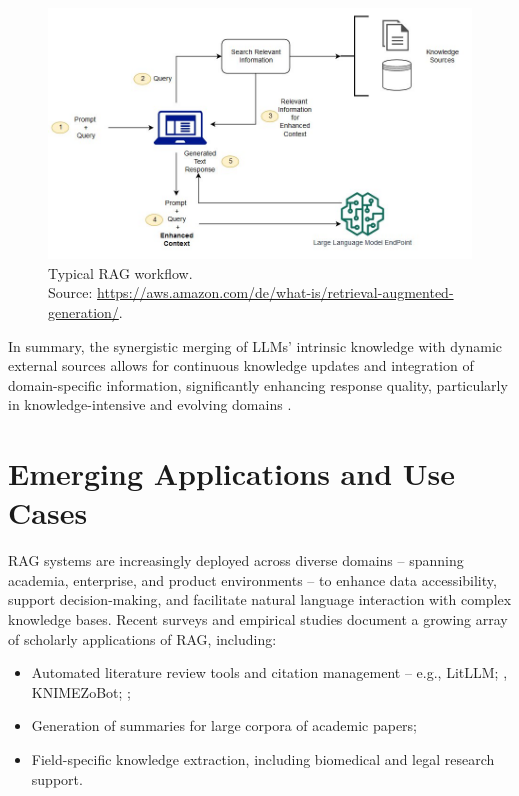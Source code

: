 \begin{spacing}{1.5}
\vspace{0.5em}
\begin{figure}[H]
  \centering
  \includegraphics[width=\textwidth]{images/rag_workflow.jpg} 
  \caption{Typical RAG workflow.\\
  \footnotesize{Source: \url{https://aws.amazon.com/de/what-is/retrieval-augmented-generation/}.\nocite{noauthor_was_nodate}}}
  \label{fig:rag}
\end{figure}
\vspace{0.5em}

\noindent In summary, the synergistic merging of LLMs' intrinsic knowledge with dynamic external sources allows for continuous knowledge updates and integration of domain-specific information, significantly enhancing response quality, particularly in knowledge-intensive and evolving domains \parencite{wang_searching_2024, gao_retrieval-augmented_2024}.

\section{Emerging Applications and Use Cases}\label{sec:evol_qas}
RAG systems are increasingly deployed across diverse domains -- spanning academia, enterprise, and product environments -- to enhance data accessibility, support decision-making, and facilitate natural language interaction with complex knowledge bases. Recent surveys and empirical studies document a growing array of scholarly applications of RAG, including:
\begin{itemize}
    \item Automated literature review tools and citation management -- e.g., LitLLM; \citep{agarwal_litllm_2025}, KNIMEZoBot; \citep{alshammari_knimezobot_2023};
    \item Generation of summaries for large corpora of academic papers;
    \item Field-specific knowledge extraction, including biomedical and legal research support.
\end{itemize}


\end{spacing}

